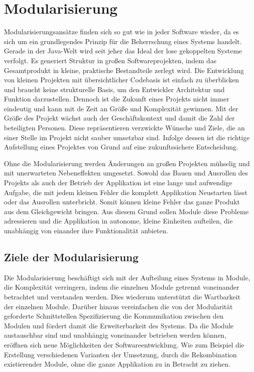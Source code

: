 \chapter{Modularisierung} \label{cha:modularisierung}

  Modularisierungsansätze finden sich so gut wie in jeder Software wieder, da es sich um ein grundlegendes Prinzip für die Beherrschung eines Systems handelt. Gerade in der Java-Welt wird seit jeher das Ideal der lose gekoppelten Systeme verfolgt. 
  Es generiert Struktur in großen Softwareprojekten, indem das Gesamtprodukt in kleine, praktische Bestandteile zerlegt wird. 
  Die Entwicklung von kleinen Projekten mit übersichtlicher Codebasis ist einfach zu überblicken und braucht keine strukturelle Basis, um den Entwickler Architektur und Funktion darzustellen. Dennoch ist die Zukunft eines Projekts nicht immer eindeutig und kann mit de Zeit an Größe und Komplexität gewinnen. Mit der Größe des Projekt wächst auch der Geschäftskontext und damit die Zahl der beteiligten Personen. Diese repräsentieren verzwickte Wünsche und Ziele, die an einer Stelle im Projekt nicht sauber umsetzbar sind. Infolge dessen ist die richtige Aufstellung eines Projektes von Grund auf eine zukunftssichere Entscheidung.\bigbreak 
  

  Ohne die Modularisierung werden Änderungen an großen Projekten mühselig und mit unerwarteten Nebeneffekten umgesetzt. Sowohl das Bauen und Ausrollen des Projekts als auch der Betrieb der Applikation ist eine lange und aufwendige Aufgabe, die mit jedem kleinen Fehler die komplett Applikation Neustarten lässt oder das Ausrollen unterbricht. Somit können kleine Fehler das ganze Produkt aus dem Gleichgewicht bringen. Aus diesem Grund sollen Module diese Probleme adressieren und die Applikation in autonome, kleine Einheiten aufteilen, die unabhängig von einander ihre Funktionalität anbieten.

  \section{Ziele der Modularisierung} \label{sec:ZdM}
    Die Modularisierung beschäftigt sich mit der Aufteilung eines Systems in Module, die Komplexität verringern, indem die einzelnen Module getrennt voneinander betrachtet und verstanden werden. Dies wiederum unterstützt die Wartbarkeit der einzelnen Module. Darüber hinaus vereinfachen die von der Modularität geforderte Schnittstellen Spezifizierung die Kommunikation zwischen den Modulen und fördert damit die Erweiterbarkeit des Systems. Da die Module austauschbar sind und unabhängig voneinander betrieben werden können, eröffnen sich neue Möglichkeiten der Softwareentwicklung. Wie zum Beispiel die Erstellung verschiedenen Varianten der Umsetzung, durch die Rekombination existierender Module, ohne die ganze Applikation zu in Betracht zu ziehen.\bigbreak

